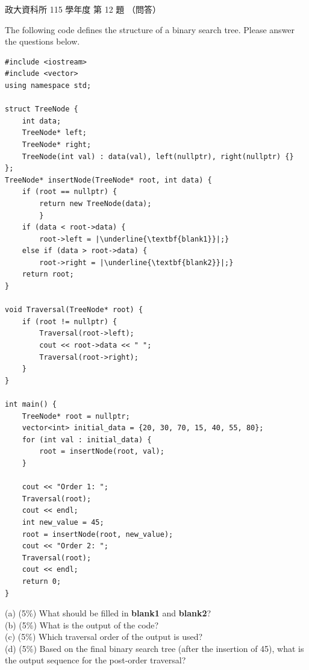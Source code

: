 \begin{pastexam}[label={px:nccu-115-dsa-12}]{政大資科所 115 學年度 第 12 題}
（問答）

The following code defines the structure of a binary search tree. Please answer the questions below.
\begin{verbatim}
#include <iostream>
#include <vector>
using namespace std;

struct TreeNode {
    int data;
    TreeNode* left;
    TreeNode* right;
    TreeNode(int val) : data(val), left(nullptr), right(nullptr) {}
};
TreeNode* insertNode(TreeNode* root, int data) {
    if (root == nullptr) {
        return new TreeNode(data);
        }
    if (data < root->data) {
        root->left = |\underline{\textbf{blank1}}|;}
    else if (data > root->data) {
        root->right = |\underline{\textbf{blank2}}|;}
    return root;
}

void Traversal(TreeNode* root) {
    if (root != nullptr) {
        Traversal(root->left);
        cout << root->data << " ";
        Traversal(root->right);
    }
}

int main() {
    TreeNode* root = nullptr;
    vector<int> initial_data = {20, 30, 70, 15, 40, 55, 80};
    for (int val : initial_data) {
        root = insertNode(root, val);
    }

    cout << "Order 1: ";
    Traversal(root);
    cout << endl;
    int new_value = 45;
    root = insertNode(root, new_value);
    cout << "Order 2: ";
    Traversal(root);
    cout << endl;
    return 0;
}
\end{verbatim}
(a) (5\%) What should be filled in \textbf{blank1} and \textbf{blank2}?\\
(b) (5\%) What is the output of the code?\\
(c) (5\%) Which traversal order of the output is used?\\
(d) (5\%) Based on the final binary search tree (after the insertion of 45), what is the output sequence for
the post-order traversal?
\end{pastexam}

